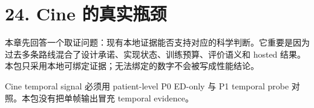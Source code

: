 \section{24. Cine 的真实瓶颈}

本章先回答一个取证问题：现有本地证据能否支持对应的科学判断。它重要是因为过去多条路线混合了设计承诺、实现状态、训练预算、评价语义和 hosted 结果。本包只采用本地可绑定证据；无法绑定的数字不会被写成性能结论。



Cine temporal signal 必须用 patient-level P0 ED-only 与 P1 temporal probe 对照。本包没有把单帧输出冒充 temporal evidence。



\clearpage